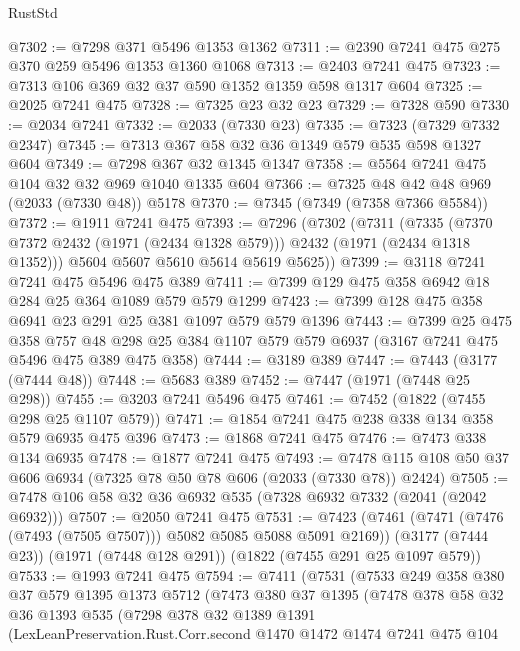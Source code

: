 \begin{lexlean}{RustStd}
\begin{coremodule}
@7302 := @7298 @371 @5496 @1353 @1362
@7311 := @2390 @7241 @475 @275 @370 @259 @5496 @1353 @1360 @1068
@7313 := @2403 @7241 @475
@7323 := @7313 @106 @369 @32 @37 @590 @1352 @1359 @598 @1317 @604
@7325 := @2025 @7241 @475
@7328 := @7325 @23 @32 @23
@7329 := @7328 @590
@7330 := @2034 @7241
@7332 := @2033 (@7330 @23)
@7335 := @7323 (@7329 @7332 @2347)
@7345 := @7313 @367 @58 @32 @36 @1349 @579 @535 @598 @1327 @604
@7349 := @7298 @367 @32 @1345 @1347
@7358 := @5564 @7241 @475 @104 @32 @32 @969 @1040 @1335 @604
@7366 := @7325 @48 @42 @48 @969 (@2033 (@7330 @48)) @5178
@7370 := @7345 (@7349 (@7358 @7366 @5584))
@7372 := @1911 @7241 @475
@7393 := @7296
    (@7302
      (@7311
        (@7335 (@7370 @7372 @2432 (@1971 (@2434 @1328 @579))) @2432 (@1971 (@2434 @1318 @1352)))
        @5604
        @5607
        @5610
        @5614
        @5619
        @5625))
@7399 := @3118 @7241 @7241 @475 @5496 @475 @389
@7411 := @7399 @129 @475 @358 @6942 @18 @284 @25 @364 @1089 @579 @579 @1299
@7423 := @7399 @128 @475 @358 @6941 @23 @291 @25 @381 @1097 @579 @579 @1396
@7443 := @7399
    @25
    @475
    @358
    @757
    @48
    @298
    @25
    @384
    @1107
    @579
    @579
    @6937
    (@3167 @7241 @475 @5496 @475 @389 @475 @358)
@7444 := @3189 @389
@7447 := @7443 (@3177 (@7444 @48))
@7448 := @5683 @389
@7452 := @7447 (@1971 (@7448 @25 @298))
@7455 := @3203 @7241 @5496 @475
@7461 := @7452 (@1822 (@7455 @298 @25 @1107 @579))
@7471 := @1854 @7241 @475 @238 @338 @134 @358 @579 @6935 @475 @396
@7473 := @1868 @7241 @475
@7476 := @7473 @338 @134 @6935
@7478 := @1877 @7241 @475
@7493 := @7478 @115 @108 @50 @37 @606 @6934 (@7325 @78 @50 @78 @606 (@2033 (@7330 @78)) @2424)
@7505 := @7478 @106 @58 @32 @36 @6932 @535 (@7328 @6932 @7332 (@2041 (@2042 @6932)))
@7507 := @2050 @7241 @475
@7531 := @7423
    (@7461 (@7471 (@7476 (@7493 (@7505 @7507))) @5082 @5085 @5088 @5091 @2169))
    (@3177 (@7444 @23))
    (@1971 (@7448 @128 @291))
    (@1822 (@7455 @291 @25 @1097 @579))
@7533 := @1993 @7241 @475
@7594 := @7411
    (@7531
      (@7533
        @249
        @358
        @380
        @37
        @579
        @1395
        @1373
        @5712
        (@7473
          @380
          @37
          @1395
          (@7478
            @378
            @58
            @32
            @36
            @1393
            @535
            (@7298
              @378
              @32
              @1389
              @1391
              (LexLeanPreservation.Rust.Corr.second
                @1470
                @1472
                @1474
                @7241
                @475
                @104

\end{coremodule}
\end{lexlean}
